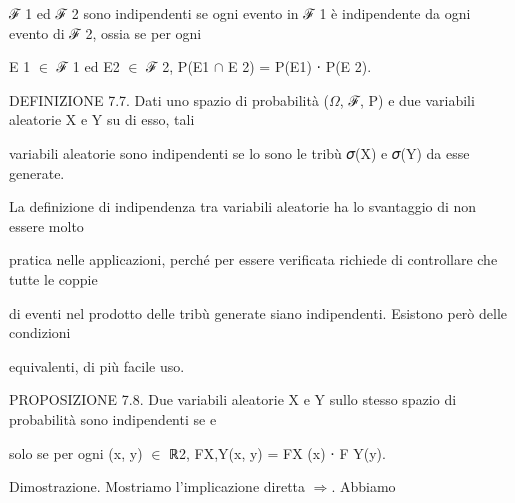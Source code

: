 \documentclass[a4paper,portrait,12pt]{article}
\begin{document}
\begin{flushleft}
ℱ 1 ed ℱ 2 sono indipendenti se ogni evento in ℱ 1 \`{e} indipendente da ogni evento di ℱ 2, ossia se per ogni
\end{flushleft}


\begin{flushleft}
E 1 $\in$ ℱ 1 ed E2 $\in$ ℱ 2, P(E1 $\cap$ E 2) = P(E1) ⋅ P(E 2).
\end{flushleft}


\begin{flushleft}
DEFINIZIONE 7.7. Dati uno spazio di probabilit\`{a} ($\Omega$, ℱ, P) e due variabili aleatorie X e Y su di esso, tali
\end{flushleft}


\begin{flushleft}
variabili aleatorie sono indipendenti se lo sono le tribù 𝜎(X) e 𝜎(Y) da esse generate.
\end{flushleft}


\begin{flushleft}
La definizione di indipendenza tra variabili aleatorie ha lo svantaggio di non essere molto
\end{flushleft}


\begin{flushleft}
pratica nelle applicazioni, perch\'{e} per essere verificata richiede di controllare che tutte le coppie
\end{flushleft}


\begin{flushleft}
di eventi nel prodotto delle tribù generate siano indipendenti. Esistono per\`{o} delle condizioni
\end{flushleft}


\begin{flushleft}
equivalenti, di più facile uso.
\end{flushleft}


\begin{flushleft}
PROPOSIZIONE 7.8. Due variabili aleatorie X e Y sullo stesso spazio di probabilit\`{a} sono indipendenti se e
\end{flushleft}


\begin{flushleft}
solo se per ogni (x, y) $\in$ ℝ2, FX,Y(x, y) = FX (x) ⋅ F Y(y).
\end{flushleft}


\begin{flushleft}
Dimostrazione. Mostriamo l'implicazione diretta $\Rightarrow$. Abbiamo
\end{flushleft}
\end{document}
